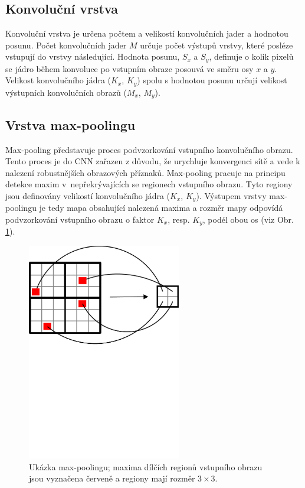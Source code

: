 {\subsection*{Konvoluční vrstva}
\par{Konvoluční vrstva je určena počtem a velikostí konvolučních jader a hodnotou posunu. Počet konvolučních jader $M$ určuje počet výstupů vrstvy, které posléze vstupují do vrstvy následující. Hodnota posunu, $S_x$ a $S_y$, definuje o kolik pixelů se jádro během konvoluce po vstupním obraze posouvá ve směru osy $x$ a $y$. Velikost konvolučního jádra ($K_x$, $K_y$) spolu s hodnotou posunu určují velikost výstupních konvolučních obrazů ($M_x$, $M_y$).}

\subsection*{Vrstva max-poolingu}
\par{Max-pooling představuje proces podvzorkování vstupního konvolučního obrazu. Tento proces je do CNN zařazen z důvodu, že urychluje konvergenci sítě a vede k nalezení robustnějších obrazových příznaků. Max-pooling pracuje na principu detekce maxim v~nepřekrývajících se regionech vstupního obrazu. Tyto regiony jsou definovány velikostí konvolučního jádra ($K_x$, $K_y$). Výstupem vrstvy max-poolingu je tedy mapa obsahující nalezená maxima a rozměr mapy odpovídá podvzorkování vstupního obrazu o faktor $K_x$, resp. $K_y$, podél obou os (viz Obr. \ref{fig:CNN02}).
\begin{figure}[!ht]
	\centering
	\includegraphics[width = 0.6\textwidth, trim = 0cm 15cm 0cm 0cm]{./Img/Prednaska09/cnn/CNN02.pdf}
	\caption{Ukázka max-poolingu; maxima dílčích regionů vstupního obrazu jsou vyznačena červeně a regiony mají rozměr $3\times 3$.}
	\label{fig:CNN02}
\end{figure}}

}
